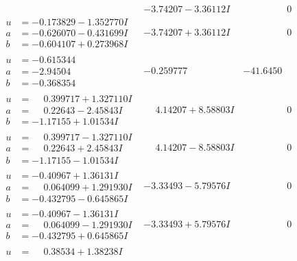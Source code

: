 \documentclass[1p]{elsarticle_modified}
\theoremstyle{definition}
\begin{document}
$$\begin{array}{c|c|c}
 & -3.74207 - 3.36112 I & \phantom{-0.000000 } 0 \\ \hline\begin{aligned}
u &= -0.173829 - 1.352770 I \\
a &= -0.626070 - 0.431699 I \\
b &= -0.604107 + 0.273968 I\end{aligned}
 & -3.74207 + 3.36112 I & \phantom{-0.000000 } 0 \\ \hline\begin{aligned}
u &= -0.615344\phantom{ +0.000000I} \\
a &= -2.94504\phantom{ +0.000000I} \\
b &= -0.368354\phantom{ +0.000000I}\end{aligned}
 & -0.259777\phantom{ +0.000000I} & -41.6450\phantom{ +0.000000I} \\ \hline\begin{aligned}
u &= \phantom{-}0.399717 + 1.327110 I \\
a &= \phantom{-}0.22643 - 2.45843 I \\
b &= -1.17155 + 1.01534 I\end{aligned}
 & \phantom{-}4.14207 + 8.58803 I & \phantom{-0.000000 } 0 \\ \hline\begin{aligned}
u &= \phantom{-}0.399717 - 1.327110 I \\
a &= \phantom{-}0.22643 + 2.45843 I \\
b &= -1.17155 - 1.01534 I\end{aligned}
 & \phantom{-}4.14207 - 8.58803 I & \phantom{-0.000000 } 0 \\ \hline\begin{aligned}
u &= -0.40967 + 1.36131 I \\
a &= \phantom{-}0.064099 + 1.291930 I \\
b &= -0.432795 - 0.645865 I\end{aligned}
 & -3.33493 - 5.79576 I & \phantom{-0.000000 } 0 \\ \hline\begin{aligned}
u &= -0.40967 - 1.36131 I \\
a &= \phantom{-}0.064099 - 1.291930 I \\
b &= -0.432795 + 0.645865 I\end{aligned}
 & -3.33493 + 5.79576 I & \phantom{-0.000000 } 0 \\ \hline\begin{aligned}
u &= \phantom{-}0.38534 + 1.38238 I \\

\end{aligned}
\end{array}$$
\end{document}
